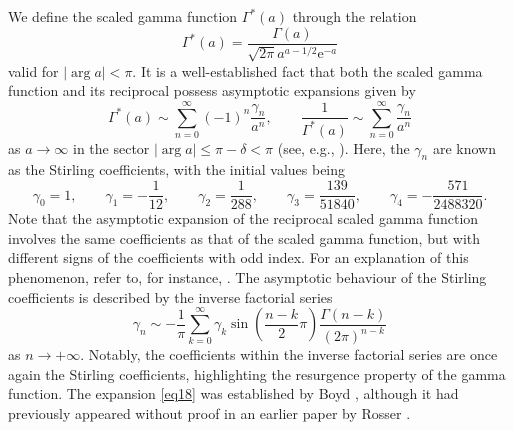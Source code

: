 \documentclass[11pt]{article}
\numberwithin{equation}{section}
\def\e{\mathrm{e}}
\numberwithin{equation}{section}
\begin{document}
We define the scaled gamma function $\Gamma^\ast(a)$ through the relation
\begin{equation}\label{eq24}
\Gamma^\ast (a) = \frac{\Gamma (a)}{\sqrt {2\pi } a^{a - 1/2} \e^{ - a} }
\end{equation}
valid for $|\arg a|<\pi$. It is a well-established fact that both the scaled gamma function and its reciprocal possess asymptotic expansions given by
\begin{equation}\label{eq25}
\Gamma^\ast (a) \sim \sum_{n = 0}^\infty ( - 1)^n \frac{\gamma _n }{a^n } ,\qquad \frac{1}{\Gamma^\ast (a)} \sim \sum_{n = 0}^\infty \frac{\gamma _n }{a^n }
\end{equation}
as $a\to \infty$ in the sector $|\arg a| \le \pi-\delta<\pi$ (see, e.g., \cite[Section~3.6]{Temme1996}). Here, the $\gamma_n$ are known as the Stirling coefficients, with the initial values being
\[
\gamma _0 = 1,\qquad\gamma _1 = - \frac{1}{12},\qquad\gamma _2 = \frac{1}{288},\qquad\gamma _3 = \frac{139}{51840},\qquad\gamma _4 = - \frac{571}{2488320}.
\]
Note that the asymptotic expansion of the reciprocal scaled gamma function involves the same coefficients as that of the scaled gamma function, but with different signs of the coefficients with odd index. For an explanation of this phenomenon, refer to, for instance, \cite[p.~63]{Temme1996}. The asymptotic behaviour of the Stirling coefficients is described by the inverse factorial series
\begin{equation}\label{eq18}
\gamma _n \sim -\frac{1}{\pi}\sum_{k= 0}^{\infty} \gamma_k \sin\left( \frac{n -k}{2}\pi \right)\frac{\Gamma (n - k)}{(2\pi )^{n - k}}
\end{equation}
as $n\to+\infty$. Notably, the coefficients within the inverse factorial series are once again the Stirling coefficients, highlighting the resurgence property of the gamma function. The expansion \eqref{eq18} was established by Boyd \cite[equation~(3.34)]{Boyd1994}, although it had previously appeared without proof in an earlier paper by Rosser \cite[equation~(97)]{Rosser1955}.
\end{document}
